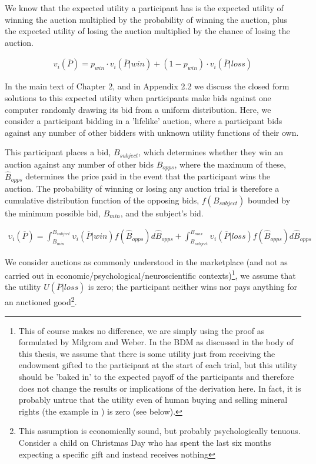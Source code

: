 We know that the expected utility a participant has is the expected utility of winning the auction multiplied by the probability of winning the auction, plus the expected utility of losing the auction multiplied by the chance of losing the auction.

\begin{equation}
\begin{aligned}
v_i(\overline{P}) = p_{win} \cdot v_i(\overline{P}|win) + (1 - p_{win}) \cdot v_i(\overline{P}|loss)
\end{aligned}
\label{eq:bdm_ic1}
\end{equation}

In the main text of Chapter 2, and in Appendix 2.2 we discuss the closed form solutions to this expected utility when participants make bids against one computer randomly drawing its bid from a uniform distribution. Here, we consider a participant bidding in a 'lifelike' auction, where a participant bids against any number of other bidders with unknown utility functions of their own.

This participant places a bid, $B_{subject}$, which determines whether they win an auction against any number of other bids $B_{opps}$, where the maximum of these, $\hat{B}_{opps}$ determines the price paid in the event that the participant wins the auction. The probability of winning or losing any auction trial is therefore a cumulative distribution function of the opposing bids, $f(B_{subject})$ bounded by the minimum possible bid, $B_{min}$, and the subject's bid.

\begin{equation}
\begin{aligned}
\upsilon_i(\overline{P}) = \int_{B_{min}}^{B_{subject}} \upsilon_i(\overline{P}|win)f(\hat{B}_{opps})d\hat{B}_{opps} + \int_{B_{subject}}^{B_{max}} \upsilon_i(\overline{P}|loss)f(\hat{B}_{opps})d\hat{B}_{opps}
\end{aligned}
\label{eq:bdm_ic2}
\end{equation}

We consider auctions as commonly understood in the marketplace (and not as carried out in economic/psychological/neuroscientific contexts)\footnote{This of course makes no difference, we are simply using the proof as formulated by Milgrom and Weber. In the BDM as discussed in the body of this thesis, we assume that there is some utility just from receiving the endowment gifted to the participant at the start of each trial, but this utility should be 'baked in' to the expected payoff of the participants and therefore does not change the results or implications of the derivation here. In fact, it is probably untrue that the utility even of human buying and selling mineral rights (the example in \cite{milgromTheoryAuctionsCompetitive1982}) is zero (see below).}, we assume that the utility $U(\overline{P}|{loss})$ is zero; the participant neither wins nor pays anything for an auctioned good\footnote{This assumption is economically sound, but probably psychologically tenuous. Consider a child on Christmas Day who has spent the last six months expecting a specific gift and instead receives nothing}.

